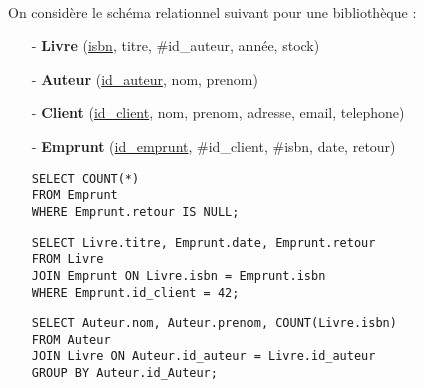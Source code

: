 \documentclass[11pt,a4paper]{article}
\begin{document}
\begin{Exercise}[title = {Résultats de requêtes}]\\
On considère le schéma relationnel suivant pour une bibliothèque :
\begin{itemize}
    \item[-] \textbf{Livre} (\underline{isbn}, titre, \#id\_auteur, année, stock)
    \item[-] \textbf{Auteur} (\underline{id\_auteur}, nom, prenom)
    \item[-] \textbf{Client} (\underline{id\_client}, nom, prenom, adresse, email, telephone)
    \item[-] \textbf{Emprunt} (\underline{id\_emprunt}, \#id\_client, \#isbn, date, retour)
\end{itemize}
\begin{enumerate}
\item[]
\begin{verbatim}
SELECT COUNT(*)
FROM Emprunt
WHERE Emprunt.retour IS NULL;
\end{verbatim}
\item[]
\begin{verbatim}
SELECT Livre.titre, Emprunt.date, Emprunt.retour
FROM Livre
JOIN Emprunt ON Livre.isbn = Emprunt.isbn
WHERE Emprunt.id_client = 42;
\end{verbatim}
\item[]
\begin{verbatim}
SELECT Auteur.nom, Auteur.prenom, COUNT(Livre.isbn)
FROM Auteur
JOIN Livre ON Auteur.id_auteur = Livre.id_auteur
GROUP BY Auteur.id_Auteur;    
\end{verbatim}
\end{enumerate}
\end{Exercise}
\end{document}
